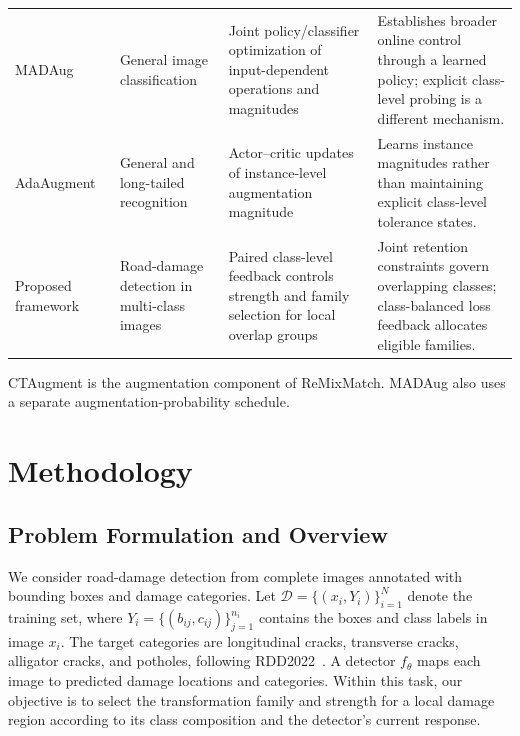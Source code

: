 \documentclass[conference]{IEEEtran}
\begin{document}
\begin{table}[t]
\begin{tabularx}{\textwidth}{@{}p{}p{}p{}Y@{}}
MADAug~\cite{hou2023madaug} & General image classification & Joint policy/classifier optimization of input-dependent operations and magnitudes & Establishes broader online control through a learned policy; explicit class-level probing is a different mechanism. \\
AdaAugment~\cite{yang2025adaaugment} & General and long-tailed recognition & Actor--critic updates of instance-level augmentation magnitude & Learns instance magnitudes rather than maintaining explicit class-level tolerance states. \\
Proposed framework & Road-damage detection in multi-class images & Paired class-level feedback controls strength and family selection for local overlap groups & Joint retention constraints govern overlapping classes; class-balanced loss feedback allocates eligible families. \\
\bottomrule
\end{tabularx}
\vspace{3pt}
\begin{minipage}{\textwidth}
\footnotesize
CTAugment is the augmentation component of ReMixMatch. MADAug also uses a separate augmentation-probability schedule.
\end{minipage}
\end{table}

\section{Methodology}
\label{sec:method}

\subsection{Problem Formulation and Overview}
\label{sec:method_problem}

We consider road-damage detection from complete images annotated with bounding boxes and damage categories. Let $\mathcal{D}=\{(x_i,Y_i)\}_{i=1}^{N}$ denote the training set, where $Y_i=\{(b_{ij},c_{ij})\}_{j=1}^{n_i}$ contains the boxes and class labels in image $x_i$. The target categories are longitudinal cracks, transverse cracks, alligator cracks, and potholes, following RDD2022~\cite{arya2024rdd}. A detector $f_\theta$ maps each image to predicted damage locations and categories. Within this task, our objective is to select the transformation family and strength for a local damage region according to its class composition and the detector's current response.
\end{document}
